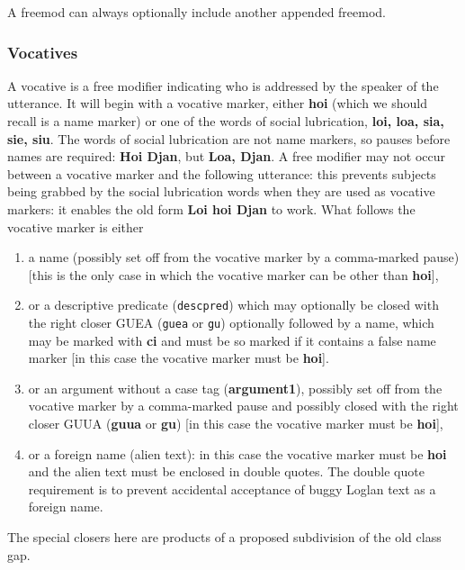 \documentclass[12pt]{book}
\begin{document}
A freemod can always optionally include another appended freemod.

\subsubsection{Vocatives}

A vocative is a free modifier indicating who is addressed by the speaker of the utterance.  It will begin with a vocative marker, either
{\bf hoi} (which we should recall is a name marker) or one of the words of social lubrication, {\bf loi, loa, sia, sie, siu}.  The words of social lubrication are not name markers, so pauses before names are required:  {\bf Hoi Djan}, but {\bf Loa, Djan}.  A free modifier may not occur between a vocative marker and the following utterance:  this prevents subjects being grabbed by the social lubrication words when they are used as vocative markers:  it enables the old form {\bf Loi hoi Djan} to work.  What follows the vocative marker is either 

\begin{enumerate}

\item a name (possibly set off from the vocative marker by a comma-marked pause) [this is the only case in which the vocative marker can be other than {\bf hoi}], 


\item or a descriptive predicate ({\tt descpred}) which may optionally be closed with the right closer GUEA ({\tt guea} or {\tt gu}) optionally followed by a name, which may be marked with {\bf ci} and must be so marked if it contains a false name marker [in this case the vocative marker must be {\bf hoi}].

\item or an argument without a case tag ({\bf argument1}), possibly set off from the vocative marker by a comma-marked pause and possibly closed with the right closer GUUA ({\bf guua} or {\bf gu})  [in this case the vocative marker must be {\bf hoi}],

\item or a foreign name (alien text):  in this case the vocative marker must be {\bf hoi} and the alien text must be enclosed in double quotes.  The double quote requirement is to prevent accidental acceptance of buggy Loglan text as a foreign name.

\end{enumerate}

The special closers here are products of a proposed subdivision of the old class gap.
\end{document}
